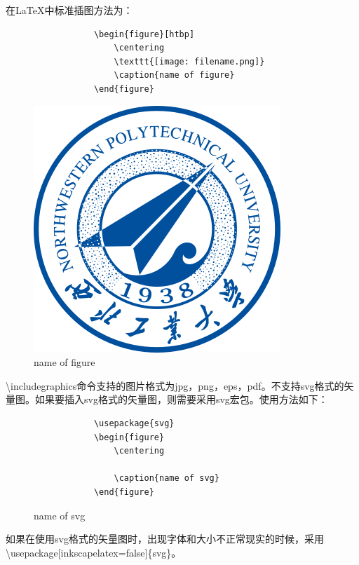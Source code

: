 \documentclass[12pt]{book}
\begin{document}
在\LaTeX{}中标准插图方法为：
\begin{figure}[htbp]
	\begin{minipage}{0.45\textwidth}
		\begin{verbatim}
			\begin{figure}[htbp]
				\centering
				\texttt{[image: filename.png]}
				\caption{name of figure}
			\end{figure}
		\end{verbatim}
	\end{minipage}
	\begin{minipage}{0.45\textwidth}
		\centering
		\includegraphics[scale=0.2]{logo.png}
		\caption{name of figure}
	\end{minipage}
\end{figure}

\textbackslash includegraphics命令支持的图片格式为jpg，png，eps，pdf。不支持svg格式的矢量图。如果要插入svg格式的矢量图，则需要采用svg宏包。使用方法如下：

\begin{figure}[htbp]
	\begin{minipage}{0.45\textwidth}
		\begin{verbatim}
			\usepackage{svg}
			\begin{figure}
				\centering
				
				\caption{name of svg}
			\end{figure}
		\end{verbatim}
	\end{minipage}
	\begin{minipage}{0.45\textwidth}
		\centering
		
		\caption{name of svg}
	\end{minipage}
\end{figure}
如果在使用svg格式的矢量图时，出现字体和大小不正常现实的时候，采用\textbackslash usepackage[inkscapelatex=false]\{svg\}。
\end{document}
